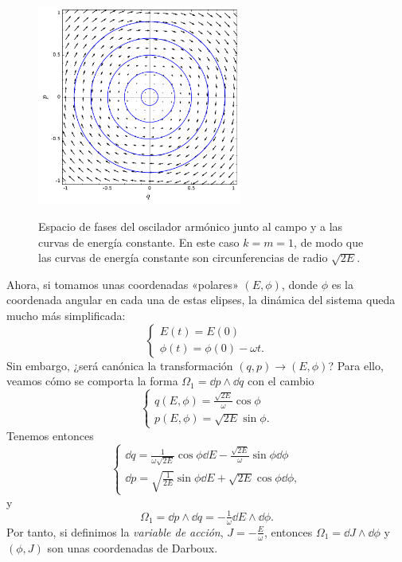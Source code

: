   \begin{figure}[h]
    \centering
    \includegraphics[width=0.6\textwidth]{pics/oscilador}
    \label{fig:oscilador}
    \caption{\small Espacio de fases del oscilador armónico junto al campo y a las curvas de energía constante. En este caso $k=m=1$, de modo que las curvas de energía constante son circunferencias de radio $\sqrt{2E}$.}
  \end{figure}

  Ahora, si tomamos unas coordenadas «polares» $(E,\phi)$, donde $\phi$ es la coordenada angular en cada una de estas elipses, la dinámica del sistema queda mucho más simplificada: 
  \begin{equation*}
    \begin{cases}
    E(t)=E(0) \\
    \phi(t)=\phi(0)-\omega t.
  \end{cases}
  \end{equation*}
  Sin embargo, ¿será canónica la transformación $(q,p) \rightarrow (E,\phi)$? Para ello, veamos cómo se comporta la forma $\Omega_1=\dd p\wedge \dd q$ con el cambio
  \begin{equation*}
    \begin{cases}
      q(E,\phi)=\frac{\sqrt{2E}}{\omega}\cos\phi\\
      p(E,\phi)=\sqrt{2E}\sin \phi.
    \end{cases}
  \end{equation*}
  Tenemos entonces
  \begin{equation*}
    \begin{cases}
      \dd q= \frac{1}{\omega \sqrt{2E}}\cos \phi \dd E - \frac{\sqrt{2E}}{\omega} \sin \phi \dd \phi \\
      \dd p= \sqrt{\frac{1}{2E}}\sin \phi \dd E + \sqrt{2E} \cos \phi \dd \phi,
    \end{cases}
  \end{equation*}
  y 
  \begin{equation*}
    \Omega_1= \dd p \wedge \dd q = -\tfrac{1}{\omega} \dd E \wedge \dd \phi.
  \end{equation*}
  Por tanto, si definimos la \emph{variable de acción}, $J=-\frac{E}{\omega}$, entonces $\Omega_1=\dd J \wedge \dd \phi$ y $(\phi,J)$ son unas coordenadas de Darboux.

